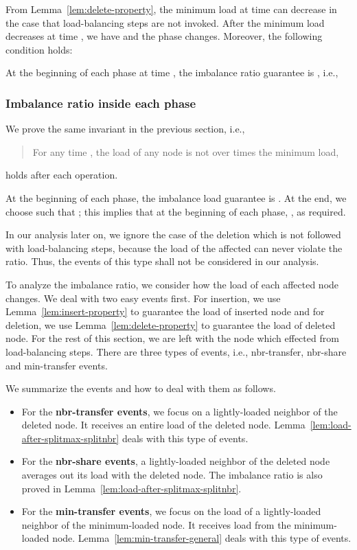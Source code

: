 \documentclass[a4paper]{article}
\begin{document}
From Lemma~\ref{lem:delete-property}, the minimum load at time  can
decrease in the case that  load-balancing steps are not invoked.
After the minimum load decreases at time , we have
 and the phase changes.  Moreover, the following
condition holds:

At the beginning of each phase at time , the imbalance ratio
guarantee is , i.e.,


\subsubsection{Imbalance ratio inside each phase}
\label{sect:inside-phase}

We prove the same invariant in the previous section, i.e.,
\begin{quote} {\sc For any time , the load of any node is not over
     times  the minimum load,}
\end{quote}
holds after each operation.

At the beginning of each phase, the imbalance load
guarantee is .  At the end, we choose  
such that ; this implies that at the beginning of 
each phase, , as required.

In our analysis later on, we ignore the case of the deletion 
which is not followed with load-balancing steps, because 
the load of the affected can never violate the ratio.  Thus,
the events of this type shall not be considered in our analysis.

To analyze the imbalance ratio, we consider how the load of
each affected node changes. We deal with two easy events first.  
For insertion, we use Lemma~\ref{lem:insert-property} to guarantee 
the load of inserted node and  for deletion, we use 
Lemma~\ref{lem:delete-property} to guarantee the load of deleted node.
For the rest of this section, we are left with the node which effected
from  load-balancing steps.  There are three types of events, i.e.,
 nbr-transfer, nbr-share and min-transfer events.

We summarize the events and how to deal with them as follows.

\begin{itemize}
\item For the {\bf nbr-transfer events}, we focus on a
  lightly-loaded neighbor of the deleted node. It receives an entire load
  of the deleted node.  Lemma~\ref{lem:load-after-splitmax-splitnbr} deals
  with this type of events.
\item For the {\bf nbr-share events}, a lightly-loaded neighbor of the
  deleted node averages out its load with the deleted node. The imbalance
  ratio is also proved in
  Lemma~\ref{lem:load-after-splitmax-splitnbr}.
\item For the {\bf min-transfer events}, we focus on the load of a
  lightly-loaded neighbor of the minimum-loaded node. It receives load
  from the minimum-loaded node.  Lemma~\ref{lem:min-transfer-general}
  deals with this type of events.
\end{itemize}
\end{document}
